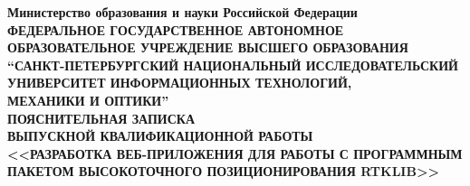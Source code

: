 
\renewcommand{\strut}{\rule[-.12\baselineskip]{0pt}{\baselineskip}}

\thispagestyle{empty}

\begin{center}
  {
    \bfseries
    {
      \subnormal
      Министерство образования и науки Российской Федерации
    } \\[-0.5em]
    {
      \scriptsize
      ФЕДЕРАЛЬНОЕ ГОСУДАРСТВЕННОЕ АВТОНОМНОЕ ОБРАЗОВАТЕЛЬНОЕ УЧРЕЖДЕНИЕ ВЫСШЕГО ОБРАЗОВАНИЯ
    } \\[-0.25em]
    {
      \subnormal
      “САНКТ-ПЕТЕРБУРГСКИЙ НАЦИОНАЛЬНЫЙ ИССЛЕДОВАТЕЛЬСКИЙ \\[-0.5em]
      УНИВЕРСИТЕТ ИНФОРМАЦИОННЫХ ТЕХНОЛОГИЙ, \\[-0.75em]
      МЕХАНИКИ И ОПТИКИ”
    } \\[0.25em]
    {
      \normalsize
      ПОЯСНИТЕЛЬНАЯ ЗАПИСКА \\[-0.5em]
      ВЫПУСКНОЙ КВАЛИФИКАЦИОННОЙ РАБОТЫ
    } \\[5.75em]
    {
      \normalsize
      <<РАЗРАБОТКА ВЕБ-ПРИЛОЖЕНИЯ ДЛЯ РАБОТЫ С ПРОГРАММНЫМ \\[-0.5em]
      ПАКЕТОМ ВЫСОКОТОЧНОГО ПОЗИЦИОНИРОВАНИЯ RTKLIB>>
    } \\[5.75em]
  }
\end{center}

